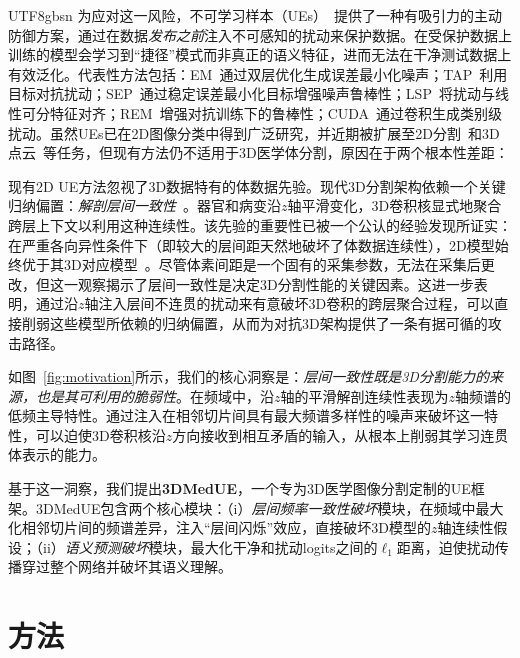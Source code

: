 \documentclass[a4paper,11pt]{article}
\begin{document}
\begin{CJK}{UTF8}{gbsn}
为应对这一风险，不可学习样本（UEs）~\cite{huang2021unlearnable}提供了一种有吸引力的主动防御方案，通过在数据\textit{发布之前}注入不可感知的扰动来保护数据。在受保护数据上训练的模型会学习到``捷径''模式而非真正的语义特征，进而无法在干净测试数据上有效泛化。代表性方法包括：EM~\cite{huang2021unlearnable}通过双层优化生成误差最小化噪声；TAP~\cite{fowl2021adversarial}利用目标对抗扰动；SEP~\cite{liu2023stable}通过稳定误差最小化目标增强噪声鲁棒性；LSP~\cite{yu2022availability}将扰动与线性可分特征对齐；REM~\cite{fu2022robust}增强对抗训练下的鲁棒性；CUDA~\cite{sadasivan2023cuda}通过卷积生成类别级扰动。虽然UEs已在2D图像分类中得到广泛研究，并近期被扩展至2D分割~\cite{sun2024unseg}和3D点云~\cite{wang2024unlearnable3d}等任务，但现有方法仍不适用于3D医学体分割，原因在于两个根本性差距：

现有2D UE方法忽视了3D数据特有的体数据先验。现代3D分割架构依赖一个关键归纳偏置：\textit{解剖层间一致性}~\cite{isensee2021nnu,dong2022mnet}。器官和病变沿$z$轴平滑变化，3D卷积核显式地聚合跨层上下文以利用这种连续性。该先验的重要性已被一个公认的经验发现所证实：在严重各向异性条件下（即较大的层间距天然地破坏了体数据连续性），2D模型始终优于其3D对应模型~\cite{isensee2021nnu,dong2022mnet}。尽管体素间距是一个固有的采集参数，无法在采集后更改，但这一观察揭示了层间一致性是决定3D分割性能的关键因素。这进一步表明，通过沿$z$轴注入层间不连贯的扰动来有意破坏3D卷积的跨层聚合过程，可以直接削弱这些模型所依赖的归纳偏置，从而为对抗3D架构提供了一条有据可循的攻击路径。

如图~\ref{fig:motivation}所示，我们的核心洞察是：\textit{层间一致性既是3D分割能力的来源，也是其可利用的脆弱性}。在频域中，沿$z$轴的平滑解剖连续性表现为$z$轴频谱的低频主导特性。通过注入在相邻切片间具有最大频谱多样性的噪声来破坏这一特性，可以迫使3D卷积核沿$z$方向接收到相互矛盾的输入，从根本上削弱其学习连贯体表示的能力。

基于这一洞察，我们提出\textbf{3DMedUE}，一个专为3D医学图像分割定制的UE框架。3DMedUE包含两个核心模块：（i）\textit{层间频率一致性破坏}模块，在频域中最大化相邻切片间的频谱差异，注入``层间闪烁''效应，直接破坏3D模型的$z$轴连续性假设；（ii）\textit{语义预测破坏}模块，最大化干净和扰动logits之间的$\ell_1$距离，迫使扰动传播穿过整个网络并破坏其语义理解。

\section{方法}


\end{CJK}
\end{document}
